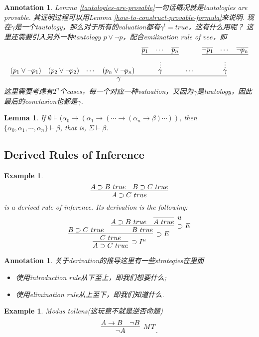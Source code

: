 \documentclass{article}
\theoremstyle{plain}
\newtheorem{lemma}[theorem]{Lemma}
\newtheorem{example}[theorem]{Example}
\newtheorem{annotation}[theorem]{Annotation}
\newcounter{case}
\theoremstyle{nonumberplain}
\begin{document}
\begin{annotation}
\rm Lemma \ref{tautologies-are-provable}一句话概况就是tautologies are provable. 其证明过程可以用Lemma \ref{how-to-construct-provable-formula}来说明. 现在$\gamma$是一个tautology，那么对于所有的valuation都有$\gamma^t = true$，这有什么用呢？ 这里还需要引入另外一种tautology $p \vee \neg p$，配合emilination rule of $vee$，即
$$
\infer{\gamma}{(p_1 \vee \neg p_1) & (p_2 \vee \neg p_2) & \cdots & (p_n \vee \neg p_n)&\deduce[\vdots]{\gamma}{\infer{}{\infer{p_1}{} & \cdots & \infer{p_n}{}}} & \cdots & \deduce[\vdots]{\gamma}{\infer{}{\infer{\neg p_1}{} & \cdots & \infer{\neg p_n}{}}}}
$$
这里需要考虑有$2^n$个cases，每一个对应一种valuation，又因为$\gamma$是tautology，因此最后的conclusion也都是$\gamma$. 
\end{annotation}

\begin{lemma}
\rm If $\emptyset \vdash (\alpha_0 \to (\alpha_1 \to (\cdots \to (\alpha_n \to \beta)\cdots))$, then $\{\alpha_0, \alpha_1,\cdots,\alpha_n\} \vdash \beta$, that is, $\Sigma \vdash \beta$. 
\end{lemma}

\newpage
\subsection{Derived Rules of Inference}

\begin{example}
\rm 
$$
\infer{A \supset C~true}{A \supset B~true & B \supset C~true}
$$
is a derived rule of inference. Its derivation is the following:
$$
\infer[\supset I^u]{A \supset C~true}{\infer[\supset E]{C~true}{B \supset C~true & \infer[\supset E]{B~true}{A \supset B~true & \infer[u]{A~true}{}}}}
$$
\end{example}

\begin{annotation}
\rm 关于derivation的推导这里有一些strategies在里面
\begin{itemize}
	\item 使用introduction rule从下至上，即我们想要什么;
	\item 使用elimination rule从上至下，即我们知道什么.
\end{itemize}
\end{annotation}

\begin{example}
\rm Modus tollens(这玩意不就是逆否命题)
$$
\infer[MT]{\neg A}{A \to B & \neg B}.
$$
\end{example}
\end{document}
